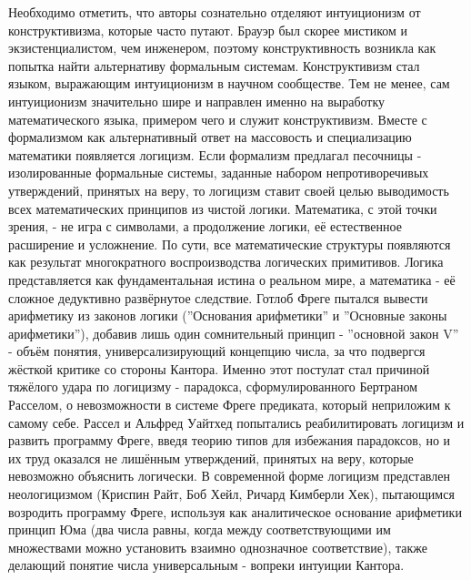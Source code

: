 \documentclass[12pt]{article}
\begin{document}
Необходимо отметить, что авторы сознательно отделяют интуиционизм от конструктивизма, которые часто путают. Брауэр был скорее мистиком и экзистенциалистом, чем инженером, поэтому конструктивность возникла как попытка найти альтернативу формальным системам. Конструктивизм стал языком, выражающим интуиционизм в научном сообществе. Тем не менее, сам интуиционизм значительно шире и направлен именно на выработку математического языка, примером чего и служит конструктивизм. Вместе с формализмом как альтернативный ответ на массовость и специализацию математики появляется логицизм. Если формализм предлагал песочницы - изолированные формальные системы, заданные набором непротиворечивых утверждений, принятых на веру, то логицизм ставит своей целью выводимость всех математических принципов из чистой логики. Математика, с этой точки зрения, - не игра с символами, а продолжение логики, её естественное расширение и усложнение. По сути, все математические структуры появляются как результат многократного воспроизводства логических примитивов. Логика представляется как фундаментальная истина о реальном мире, а математика - её сложное дедуктивно развёрнутое следствие. Готлоб Фреге пытался вывести арифметику из законов логики (''Основания арифметики'' и ''Основные законы арифметики''), добавив лишь один сомнительный принцип - ''основной закон V'' - объём понятия, универсализирующий концепцию числа, за что подвергся жёсткой критике со стороны Кантора. Именно этот постулат стал причиной тяжёлого удара по логицизму - парадокса, сформулированного Бертраном Расселом, о невозможности в системе Фреге предиката, который неприложим к самому себе. Рассел и Альфред Уайтхед попытались реабилитировать логицизм и развить программу Фреге, введя теорию типов для избежания парадоксов, но и их труд оказался не лишённым утверждений, принятых на веру, которые невозможно объяснить логически. В современной форме логицизм представлен неологицизмом (Криспин Райт, Боб Хейл, Ричард Кимберли Хек), пытающимся возродить программу Фреге, используя как аналитическое основание арифметики принцип Юма (два числа равны, когда между соответствующими им множествами можно установить взаимно однозначное соответствие), также делающий понятие числа универсальным - вопреки интуиции Кантора.
\end{document}
